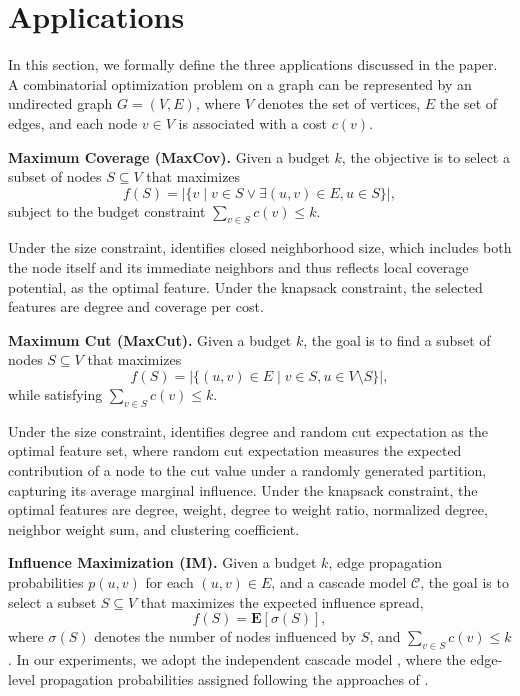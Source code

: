 \section{Applications} \label{appendix:applications}

In this section, we formally define the three applications discussed in the paper. A combinatorial optimization problem on a graph can be represented by an undirected graph $G = (V, E)$, where $V$ denotes the set of vertices, $E$ the set of edges, and each node $v \in V$ is associated with a cost $c(v)$.  

\textbf{Maximum Coverage (MaxCov).} Given a budget $k$, the objective is to select a subset of nodes $S \subseteq V$ that maximizes  
\[
f(S) = |\{v \mid v \in S \lor \exists(u, v) \in E, u \in S\}|,
\]
subject to the budget constraint $\sum_{v \in S} c(v) \leq k$.  

Under the size constraint, \llm identifies closed neighborhood size, which includes both the node itself and its immediate neighbors and thus reflects local coverage potential, as the optimal feature. Under the knapsack constraint, the selected features are degree and coverage per cost.

\textbf{Maximum Cut (MaxCut).} Given a budget $k$, the goal is to find a subset of nodes $S \subseteq V$ that maximizes  
\[
f(S) = |\{(u, v) \in E \mid v \in S, u \in V \setminus S\}|,
\]
while satisfying $\sum_{v \in S} c(v) \leq k$.  

Under the size constraint, \llm identifies degree and random cut expectation as the optimal feature set, where random cut expectation measures the expected contribution of a node to the cut value under a randomly generated partition, capturing its average marginal influence. Under the knapsack constraint, the optimal features are degree, weight, degree to weight ratio, normalized degree, neighbor weight sum, and clustering coefficient.

\textbf{Influence Maximization (IM).} Given a budget $k$, edge propagation probabilities $p(u, v)$ for each $(u, v) \in E$, and a cascade model $\mathcal{C}$, the goal is to select a subset $S \subseteq V$ that maximizes the expected influence spread,  
\[
f(S) = \mathbf{E}[\sigma(S)],
\]
where $\sigma(S)$ denotes the number of nodes influenced by $S$, and $\sum_{v \in S} c(v) \leq k$. In our experiments, we adopt the independent cascade model \citep{kempe2003maximizing}, where the edge-level propagation probabilities assigned following the approaches of \citet{ireland2022lense,manchanda2020gcomb}.



